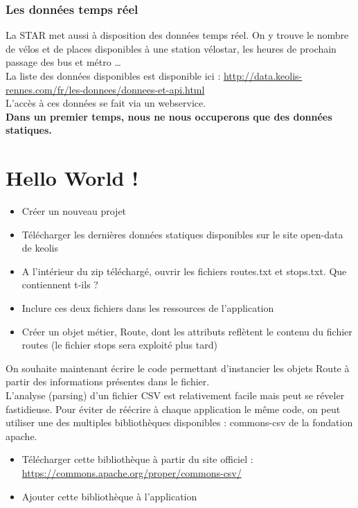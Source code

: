 \documentclass{article}
\begin{document}
\subsubsection{Les données temps réel}
La STAR met aussi à disposition des données temps réel. On y trouve le nombre de
vélos et de places disponibles à une station vélostar, les heures de prochain
passage des bus et métro \ldots\\
La liste des données disponibles est disponible ici : 
\href{http://data.keolis-rennes.com/fr/les-donnees/donnees-et-api.html}{http://data.keolis-rennes.com/fr/les-donnees/donnees-et-api.html}\\
L'accès à ces données se fait via un webservice.\\
\textbf{Dans un premier temps, nous ne nous occuperons que des données
statiques.}
\section{Hello World !}
\begin{itemize} 
  \item Créer un nouveau projet
  \item Télécharger les dernières données statiques disponibles sur le site
  open-data de keolis
  \item A l'intérieur du zip téléchargé, ouvrir les fichiers routes.txt et
  stops.txt.
  Que contiennent t-ils ?
  \item Inclure ces deux fichiers dans les ressources de l'application
  \item Créer un objet métier, Route, dont les attributs reflètent le contenu du
  fichier routes (le fichier stops sera exploité plus tard)
\end{itemize}
On souhaite maintenant écrire le code permettant d'instancier les objets Route à
partir des informations présentes dans le fichier.\\
L'analyse (parsing) d'un fichier CSV est relativement facile mais peut se
réveler fastidieuse. Pour éviter de réécrire à chaque application le même code,
on peut utiliser une des multiples bibliothèques disponibles : commons-csv de la fondation apache.
\begin{itemize}
  \item Télécharger cette bibliothèque à partir du site officiel :
  \href{https://commons.apache.org/proper/commons-csv/}{https://commons.apache.org/proper/commons-csv/}
  \item Ajouter cette bibliothèque à l'application
\end{itemize}
\end{document}
